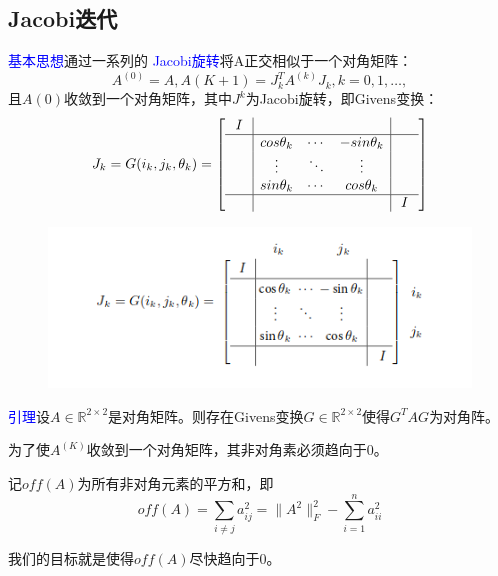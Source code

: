 \documentclass[12pt,a4paper]{article}
\begin{document}
\subsection{Jacobi迭代}
\textcolor{blue}{基本思想}\quad 通过一系列的 \textcolor{blue}{Jacobi旋转}将A正交相似于一个对角矩阵：
$$A^{(0)}=A,A{(K+1)}=J_k^TA^{(k)}J_k,k=0,1,…,$$
且$A{(0)}$收敛到一个对角矩阵，其中$J^k$为Jacobi旋转，即Givens变换：
\begin{equation}
    J_k=G(i_k,j_k,\theta _k)=\left[
    \begin{array}{c|c c c|c} 
     I&\quad &\quad &\quad &\quad\\
            \hline
            \quad &cos\theta _k&\cdots &-sin\theta _k &\quad\\
            \quad &\vdots & \ddots &\vdots &\quad \\
            \quad &sin\theta _k &\cdots &cos\theta _k &\quad \\
            \hline
           \quad &\quad &\quad & \quad &I
    \end{array}
\right]
\end{equation}
\begin{figure}[H]
\centering
\includegraphics[scale=1]{./figures/figure_1.png}
\end{figure}
\textcolor{blue}{引理}\quad 设$A\in\mathbb{R}^{2\times 2}$是对角矩阵。则存在Givens变换$G\in \mathbb{R}^{2\times 2}$使得$G^TAG$为对角阵。

为了使$A^{(K)}$收敛到一个对角矩阵，其非对角素必须趋向于0。

记$off(A)$为所有非对角元素的平方和，即
$$off(A)=\sum_{i\neq j}a_{ij}^2=\|A^2\|_F^2-\sum_{i=1}^na_{ii}^2$$

我们的目标就是使得$off(A)$尽快趋向于0。
\end{document}
